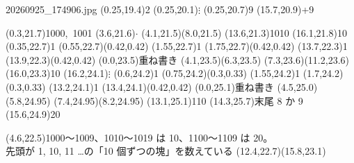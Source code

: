 \documentclass[a4paper]{article}
\def\hwc(#1,#2){\hwcircle(#1,#2)(0.42,0.42)}
\begin{document}
\begin{memopage}{20260925\_174906.jpg}
  \hw(0.25,19.4){2}
  \hw(0.25,20.1){\normalsize $\vdots$}
  \hw(0.25,20.7){9}
  \hw(15.7,20.9){+9}

  \hw(0.3,21.7){1000,\ 1001} \hw(3.6,21.6){$\cdot$}
  \hwline(4.1,21.5)(8.0,21.5)
  \hw(13.6,21.3){1010} \hw(16.1,21.8){10}
  \hw(0.35,22.7){1} \hwc(0.55,22.7)
  \hw(1.55,22.7){1} \hwc(1.75,22.7)
  \hw(13.7,22.3){1} \hwc(13.9,22.3)
  \hwunread(0.0,23.5){重ね書き}
  \hwline(4.1,23.5)(6.3,23.5) \hwline(7.3,23.6)(11.2,23.6)
  \hw(16.0,23.3){10}
  \hw(16.2,24.1){\normalsize $\vdots$}
  \hw(0.6,24.2){\normalsize 1} \hwcircle(0.75,24.2)(0.3,0.33)
  \hw(1.55,24.2){\normalsize 1} \hwcircle(1.7,24.2)(0.3,0.33)
  \hw(13.2,24.1){1} \hwc(13.4,24.1)
  \hwunread(0.0,25.1){重ね書き}
  \hwline(4.5,25.0)(5.8,24.95) \hwline(7.4,24.95)(8.2,24.95)
  \hw(13.1,25.1){110} \hwunread(14.3,25.7){末尾 8 か 9}
  \hw(15.6,24.9){20}

  \redpen(4.6,22.5){\small 1000〜1009、1010〜1019 は 10、1100〜1109 は 20。\\
    \small 先頭が 1, 10, 11 …の「10 個ずつの塊」を数えている}
  \redarrow(12.4,22.7)(15.8,23.1)
\end{memopage}
\end{document}
